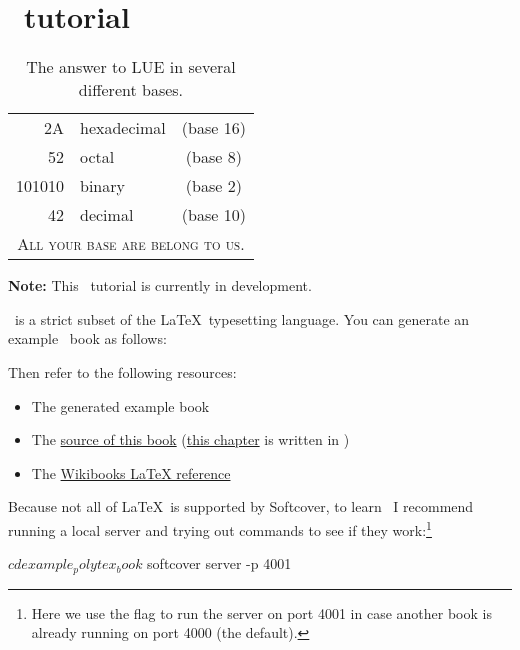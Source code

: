 \chapter{\PolyTeX\ tutorial} %
\label{cha:polytex_tutorial}

\begin{table}
\caption{The answer to LUE in several different bases.\label{table:answer}}
\begin{tabular}{|r|lc|}
  \hline
  2A & hexadecimal & (base 16) \\
  52 & octal & (base 8) \\
  101010 & binary & (base 2) \\
  \hline
  42 & decimal & (base 10) \\
  \hline
  \multicolumn{3}{|c|}{\textsc{All your base are belong to us.}} \\
  \hline
\end{tabular}
\end{table}


\noindent \textbf{Note:} This \PolyTeX\ tutorial is currently in development.

\PolyTeX\ is a strict subset of the \LaTeX\ typesetting language. You can generate an example \PolyTeX\ book as follows:


\noindent Then refer to the following resources:

\begin{itemize}
\item The generated example book
\item The \href{https://github.com/softcover/softcover_book}{source of this book} (\href{https://github.com/softcover/softcover_book/blob/master/chapters/polytex_tutorial.tex}{this chapter} is written in \PolyTeX)
\item The \href{http://en.wikibooks.org/wiki/LaTeX}{Wikibooks LaTeX reference}
\end{itemize}

Because not all of \LaTeX\ is supported by Softcover, to learn \PolyTeX\ I recommend running a local server and trying out commands to see if they work:\footnote{Here we use the  flag to run the server on port 4001 in case another book is already running on port 4000 (the default).}

\begin{code}
$ cd example_polytex_book
$ softcover server -p 4001
\end{code}

